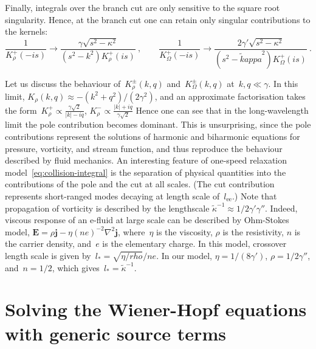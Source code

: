 \documentclass[preprint,aps,eqsecnum]{revtex4-1}
\newcommand{\fplus}[1]{{#1}^{+}}
\newcommand{\fminus}[1]{{#1}^{-}}
\newcommand{\fplusminus}[1]{{#1}^{\pm}}
\begin{document}
Finally, integrals over the branch cut are only sensitive
to the square root singularity.
Hence, at the branch cut one can retain only singular contributions
to the kernels:
\begin{equation}
  \frac{1}{\fplus{K}_\rho (-is)} \to
   \frac{\gamma\sqrt{s^2 - \kappa^2}}{(s^2 - k^2) \fplus{K}_\rho(is)}
  \ , \qquad
  \frac{1}{\fplus{K}_\Omega(-is)} \to
  \frac{2 \gamma' \sqrt{s^2 - \kappa^2}}{(s^2 - {\tilde kappa}^2)
  \fplus{K}_\Omega(is)}
  \ .
\end{equation}

Let us discuss the behaviour of~$\fplusminus{K}_\rho(k, q)$
and~$\fplusminus{K}_\Omega(k, q)$ at~$k, q \ll \gamma$. In this limit,
$K_\rho(k, q)  \approx -  (k^2 + q^2)/(2\gamma^2)$, and an approximate
factorisation takes
the form~$\fplus{K}_\rho \propto \frac{\gamma \sqrt{2}}{|k| - i q}$,
$\fminus{K}_\rho \propto \frac{|k| + i q}{\gamma \sqrt{2}}$
Hence one can see that in the
long-wavelength limit the pole contribution becomes dominant.
This is unsurprising,
since the pole contributions
represent the solutions of harmonic and biharmonic equations for
pressure, vorticity, and stream function, and thus reproduce
the behaviour described by fluid mechanics. An interesting feature
of one-speed relaxation model~\ref{eq:collision-integral} is the
separation of physical quantities into the contributions of the
pole and the cut at all scales. (The cut contribution represents
short-ranged modes decaying at length scale of~$l_\mathrm{ee}$.)
Note that propagation of vorticity is described by the lengthscale
${\tilde \kappa}^{-1} \approx 1/2 \gamma' \gamma''$. Indeed, viscous
response of an e-fluid at large scale can be described by Ohm-Stokes model, 
${\bm E} = \rho  {\bm j} - \eta (ne)^{-2} \nabla^2 {\bm j}$,
where~$\eta$ is the viscosity, $\rho$ is the resistivity, $n$
is the carrier density, and~$e$ is the elementary charge.
In this model, crossover length scale is given
by~$l_\ast = \sqrt{\eta / rho} / ne$. In our model,
$\eta = 1/(8 \gamma')$, $\rho = 1/2\gamma''$, and~$n = 1/2$, which
gives~$l_\ast = {\tilde \kappa}^{-1}$.

\section{Solving the Wiener-Hopf equations with generic source terms}
\label{sec:wh-solution}
\end{document}

